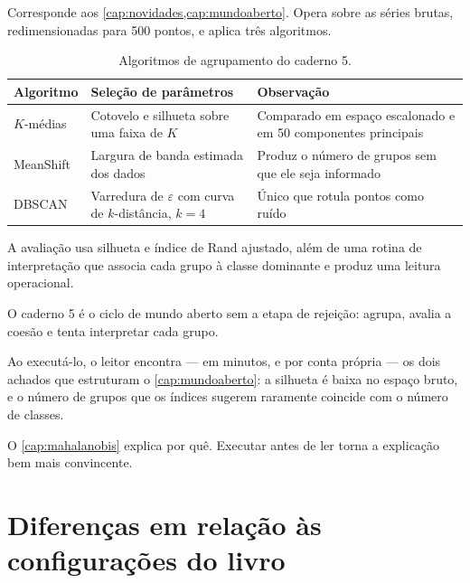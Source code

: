 Corresponde aos \cref{cap:novidades,cap:mundoaberto}. Opera sobre as séries brutas,
redimensionadas para 500 pontos, e aplica três algoritmos.

\begin{table}[htbp]
\centering
\caption{Algoritmos de agrupamento do caderno 5.}
\label{tab:pratica-agrupamento}
\small
\begin{tabular}{lp{4.0cm}p{5.0cm}}
\toprule
\textbf{Algoritmo} & \textbf{Seleção de parâmetros} & \textbf{Observação} \\
\midrule
$K$-médias & Cotovelo e silhueta sobre uma faixa de $K$ &
Comparado em espaço escalonado e em 50 componentes principais \\
\addlinespace
MeanShift & Largura de banda estimada dos dados &
Produz o número de grupos sem que ele seja informado \\
\addlinespace
DBSCAN & Varredura de $\varepsilon$ com curva de $k$-distância, $k = 4$ &
Único que rotula pontos como ruído \\
\bottomrule
\end{tabular}
\end{table}

A avaliação usa silhueta e índice de Rand ajustado, além de uma rotina de interpretação
que associa cada grupo à classe dominante e produz uma leitura operacional.

\begin{destaque}
O caderno 5 é o ciclo de mundo aberto sem a etapa de rejeição: agrupa, avalia a coesão e
tenta interpretar cada grupo.

Ao executá-lo, o leitor encontra --- em minutos, e por conta própria --- os dois achados
que estruturam o \cref{cap:mundoaberto}: a silhueta é baixa no espaço bruto, e o número
de grupos que os índices sugerem raramente coincide com o número de classes.

O \cref{cap:mahalanobis} explica por quê. Executar antes de ler torna a explicação bem
mais convincente.
\end{destaque}

\section{Diferenças em relação às configurações do livro}
\label{sec:pratica-diferencas}

